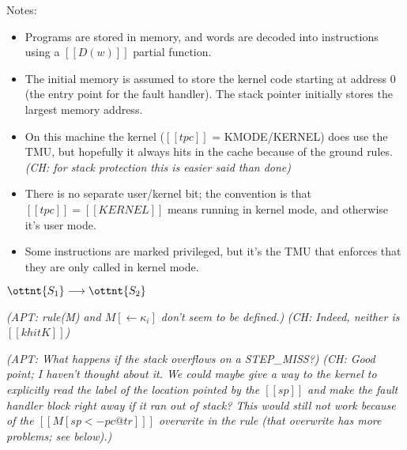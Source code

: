 \documentclass{article}
\newcommand{\ch}[1]{{\color{dkblue}\em (CH: #1)}}
\newcommand{\apt}[1]{{\color{red}\em (APT: #1)}}
\begin{document}
\noindent
Notes:
\begin{itemize}
\item Programs are stored in memory, and words are decoded into
  instructions using a $[[D(w)]]$ partial function.
\item The initial memory is assumed to store the kernel
  code starting at address 0 (the entry point for the fault handler).
  The stack pointer initially stores the largest memory address.
\item On this machine the kernel ($[[tpc]]$ = KMODE/KERNEL) does use the TMU, but
  hopefully it always hits in the cache because of the ground rules.
  \ch{for stack protection this is easier said than done}
\item There is no separate user/kernel bit; the convention is that
  $[[tpc]]=[[KERNEL]]$ means running in kernel mode, and otherwise
  it's user mode.
\item Some instructions are marked privileged, but it's
  the TMU that enforces that they are only called in kernel mode.
\end{itemize}


\medskip
\ottgrammartabular{\ottw\ottinterrule}

\ottgrammartabular{
\otta\ottinterrule
\otti\ottinterrule
\ottop\ottinterrule
\ottS\ottinterrule
\ottk\ottinterrule
\ottki\ottinterrule
\ottko\ottinterrule
}

\begin{ottdefnblock}[#1]{$\ottnt{S_{{\mathrm{1}}}}  \longrightarrow  \ottnt{S_{{\mathrm{2}}}}$}{}
\ottusedrule{\ottdruleStepXXConstXXHit{}}
\ottusedrule{\ottdruleStepXXBinOpXXHit{}}
\ottusedrule{\ottdruleStepXXLoadXXHit{}}
\ottusedrule{\ottdruleStepXXStoreXXHit{}}
\ottusedrule{\ottdruleStepXXJumpXXHit{}}
\ottusedrule{\ottdruleStepXXBnzXXHit{}}
\ottusedrule{\ottdruleStepXXCallXXHit{}}
\ottusedrule{\ottdruleStepXXReturnXXHit{}}
\ottusedrule{\ottdruleStepXXAddRuleXXHit{}}
\ottusedrule{\ottdruleStepXXGetTagXXHit{}}
\ottusedrule{\ottdruleStepXXPutTagXXHit{}}
\ottusedrule{\ottdruleStepXXMiss{}}
\end{ottdefnblock}

\apt{rule(M) and $M[\leftarrow \kappa_i]$ don't seem to be defined.}
\ch{Indeed, neither is $[[k hit K]]$}

\apt{What happens if the stack overflows on a STEP\_MISS?}
\ch{Good point; I haven't thought about it. We could maybe give a way
  to the kernel to explicitly read the label of the location pointed
  by the $[[sp]]$ and make the fault handler block right away if it
  ran out of stack? This would still not work because of the $[[M[sp
  <- pc@tr] ]]$ overwrite in the rule (that overwrite has more
  problems; see below).}
\end{document}
